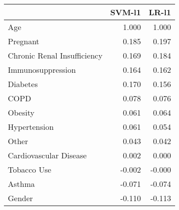 \begin{tabular}{lrr}
\toprule
{} &  SVM-l1 &  LR-l1 \\
\midrule
Age                         &   1.000 &  1.000 \\
Pregnant                    &   0.185 &  0.197 \\
Chronic Renal Insufficiency &   0.169 &  0.184 \\
Immunosuppression           &   0.164 &  0.162 \\
Diabetes                    &   0.170 &  0.156 \\
COPD                        &   0.078 &  0.076 \\
Obesity                     &   0.061 &  0.064 \\
Hypertension                &   0.061 &  0.054 \\
Other                       &   0.043 &  0.042 \\
Cardiovascular Disease      &   0.002 &  0.000 \\
Tobacco Use                 &  -0.002 & -0.000 \\
Asthma                      &  -0.071 & -0.074 \\
Gender                      &  -0.110 & -0.113 \\
\bottomrule
\end{tabular}
